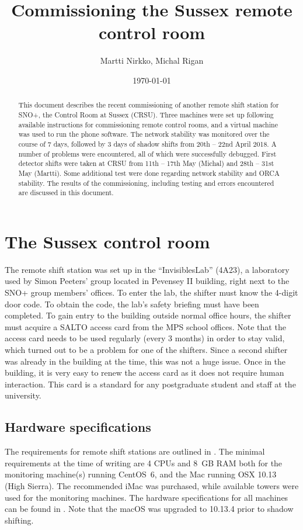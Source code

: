 \documentclass[a4paper,10pt]{article}
\title{Commissioning the Sussex remote control room}
\author{Martti Nirkko, Michal Rigan}
\date{\today}
\begin{document}
\maketitle

\begin{abstract}
This document describes the recent commissioning of another remote shift station for SNO+, the Control Room at Sussex (CRSU). Three machines were set up following available instructions for commissioning remote control rooms, and a virtual machine was used to run the phone software. The network stability was monitored over the course of 7 days, followed by 3 days of shadow shifts from 20th -- 22nd April 2018. A number of problems were encountered, all of which were successfully debugged. First detector shifts were taken at CRSU from 11th -- 17th May (Michal) and 28th -- 31st May (Martti). Some additional test were done regarding network stability and ORCA stability. The results of the commissioning, including testing and errors encountered are discussed in this document.
\end{abstract}


\section{The Sussex control room}
The remote shift station was set up in the ``InvisiblesLab'' (4A23), a laboratory used by Simon Peeters' group located in Pevensey II building, right next to the SNO+ group members' offices. To enter the lab, the shifter must know the 4-digit door code. To obtain the code, the lab's safety briefing must have been completed. To gain entry to the building outside normal office hours, the shifter must acquire a SALTO access card from the MPS school offices. Note that the access card needs to be used regularly (every 3 months) in order to stay valid, which turned out to be a problem for one of the shifters. Since a second shifter was already in the building at the time, this was not a huge issue. Once in the building, it is very easy to renew the access card as it does not require human interaction. This card is a standard for any postgraduate student and staff at the university.

\subsection{Hardware specifications}
The requirements for remote shift stations are outlined in \cite{doc4428}. The minimal requirements at the time of writing are 4 CPUs and 8~GB RAM both for the monitoring machine(s) running CentOS~6, and the Mac running OSX 10.13 (High Sierra). The recommended iMac was purchased, while available towers were used for the monitoring machines. The hardware specifications for all machines can be found in . Note that the macOS was upgraded to 10.13.4 prior to shadow shifting.
\end{document}
